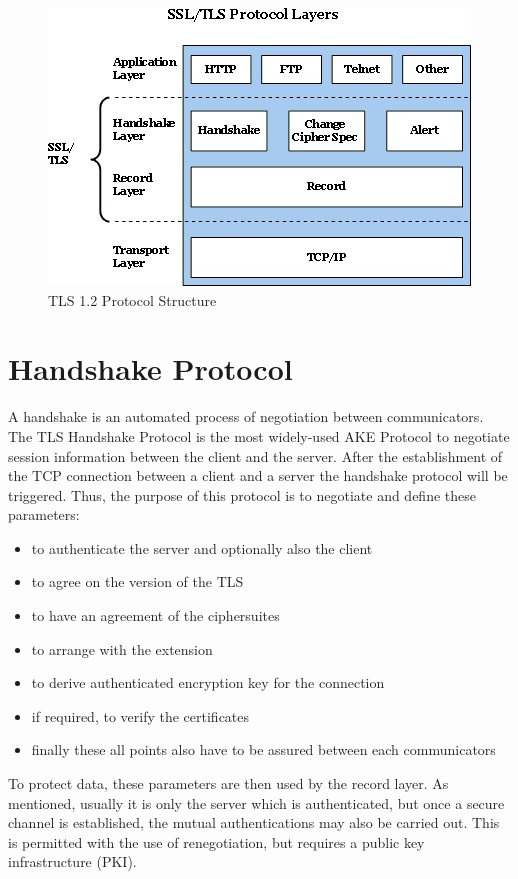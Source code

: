 \begin{figure}[H]
	\centering
		\includegraphics[scale=1]{images/tls_structure.jpg}
	\caption{TLS 1.2 Protocol Structure \cite{ms:overview}}
	\label{fig:tls_structure}
\end{figure}

\section{Handshake Protocol}
\label{sec:handshake_protocol}
 A handshake is an automated process of negotiation between communicators. The TLS Handshake Protocol is the most widely-used  AKE Protocol to negotiate session information between the client and the server. 
 After the establishment of the TCP connection between a client and a server the handshake protocol will be triggered. 
 Thus, the purpose of this protocol is to negotiate and define these parameters:
 
 \begin{itemize}
\item to authenticate the server and optionally also the client
 \item to agree on the version of the TLS
 \item to have an agreement of the ciphersuites
 \item to arrange with the extension
 \item to derive authenticated encryption key for the connection
 \item if required, to verify the certificates
 \item finally these all points also have to be assured between each communicators
\end{itemize}

To protect data, these parameters are then used by the record layer. As mentioned, usually it is only the server which is authenticated, but once a secure channel is established, the mutual authentications may also be carried out. This is permitted with the use of renegotiation, but requires a public key infrastructure (PKI). 
\cite{ms:overview}
\cite{ms:handshake}

